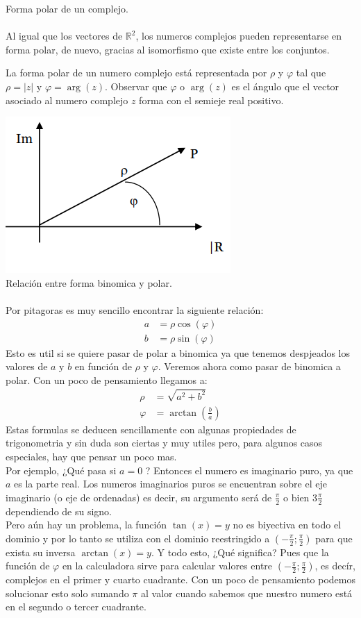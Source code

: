 \documentclass[]{article}
\begin{document}
\huge Forma polar de un complejo.
\normalsize
\\
\\
Al igual que los vectores de $\mathbb{R}^{2}$, los numeros complejos pueden representarse en forma polar, de nuevo, gracias al isomorfismo que existe entre los conjuntos. 

La forma polar de un numero complejo está representada por $\rho$ y $\varphi$ tal que $\rho = |z|$ y $\varphi = \arg(z)$. Observar que $\varphi$ o $\arg(z)$ es el ángulo que el vector asociado al numero complejo $z$ forma con el semieje real positivo.

\includegraphics{../../../Imagenes/Superior/Complejos/Complejos02.PNG}
\\
\large Relación entre forma binomica y polar.
\normalsize
\\
\\
Por pitagoras es muy sencillo encontrar la siguiente relación:
\begin{align}
  a &= \rho \cos(\varphi)\\
  b &= \rho \sin(\varphi)
\end{align}
Esto es util si se quiere pasar de polar a binomica ya que tenemos despjeados los valores de $a$ y $b$ en función de $\rho$ y $\varphi$. Veremos ahora como pasar de binomica a polar. Con un poco de pensamiento llegamos a:
\begin{align}
  \rho &=\sqrt{a^{2}+b^{2}}\\
  \varphi &= \arctan(\frac{b}{a})
\end{align}
Estas formulas se deducen sencillamente con algunas propiedades de trigonometria y sin duda son ciertas y muy utiles pero, para algunos casos especiales, hay que pensar un poco mas.
\\
Por ejemplo, ¿Qué pasa si $a=0$ ? Entonces el numero es imaginario puro, ya que $a$ es la parte real. Los numeros imaginarios puros se encuentran sobre el eje imaginario (o eje de ordenadas) es decir, su argumento será de $\frac{\pi}{2}$ o bien $3\frac{\pi}{2}$ dependiendo de su signo.
\\
Pero aún hay un problema, la función $\tan(x) = y$ no es biyectiva en todo el dominio y por lo tanto se utiliza con el dominio reestringido a $(-\frac{\pi}{2};\frac{\pi}{2})$ para que exista su inversa $\arctan(x)=y$. Y todo esto, ¿Qué significa? Pues que la función de $\varphi$ en la calculadora sirve para calcular valores entre $(-\frac{\pi}{2};\frac{\pi}{2})$, es decír, complejos en el primer y cuarto cuadrante. Con un poco de pensamiento podemos solucionar esto solo sumando $\pi$ al valor cuando sabemos que nuestro numero está en el segundo o tercer cuadrante.
\end{document}
